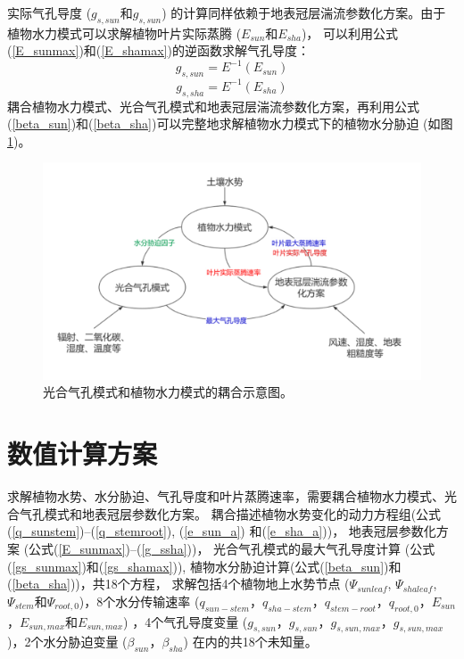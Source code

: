 实际气孔导度 ($g_{s,sun}$和$g_{s,sun}$) 的计算同样依赖于地表冠层湍流参数化方案。由于植物水力模式可以求解植物叶片实际蒸腾 ($E_{sun}$和$E_{sha}$)，
可以利用公式(\ref{E_sunmax})和(\ref{E_shamax})的逆函数求解气孔导度：
\begin{equation}\label{g_ssun}
g_{s, s u n}=E^{-1}\left(E_{s u n}\right)
\end{equation}
\begin{equation}\label{g_ssha}
g_{s, sha}=E^{-1}\left(E_{s h a}\right)
\end{equation}
耦合植物水力模式、光合气孔模式和地表冠层湍流参数化方案，再利用公式(\ref{beta_sun})和(\ref{beta_sha})可以完整地求解植物水力模式下的植物水分胁迫 (如图 \ref{fig:光合气孔模式和植物水力模式的耦合示意图})。
{
    \begin{figure}[htbp]
    \centering
    \includegraphics{Figures/植被水力模式/光合气孔模式和植物水力模式的耦合示意图.png}
    \caption{光合气孔模式和植物水力模式的耦合示意图。}
    \label{fig:光合气孔模式和植物水力模式的耦合示意图}
    \end{figure}
}


\section{数值计算方案}\label{数值计算方案}
求解植物水势、水分胁迫、气孔导度和叶片蒸腾速率，需要耦合植物水力模式、光合气孔模式和地表冠层参数化方案。
耦合描述植物水势变化的动力方程组(公式(\ref{q_sunstem})--(\ref{q_stemroot}), (\ref{e_sun_a}) 和(\ref{e_sha_a}))，
地表冠层参数化方案 (公式(\ref{E_sunmax})--(\ref{g_ssha}))，
光合气孔模式的最大气孔导度计算 (公式(\ref{gs_sunmax})和(\ref{gs_shamax})), 植物水分胁迫计算(公式(\ref{beta_sun})和(\ref{beta_sha}))，共18个方程，
求解包括4个植物地上水势节点 ($\Psi_{sunleaf}$, $\Psi_{shaleaf}$, $\Psi_{stem}$和$\Psi_{root,0}$)，8个水分传输速率 
($q_{sun-stem}$，$q_{sha-stem}$，$q_{stem-root}$，$q_{root,0}$，$E_{sun}$，$E_{sun,max}$和$E_{sun,max}$) ，4个气孔导度变量
 ($g_{s,sun}$，$g_{s,sun}$，$g_{s,sun,max}$，$g_{s,sun,max}$)，2个水分胁迫变量 ($\beta_{sun}$，$\beta_{sha}$) 在内的共18个未知量。

